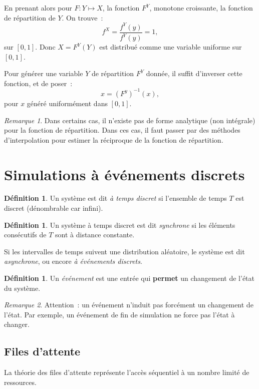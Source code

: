 \documentclass{article}
\theoremstyle{definition}
\newtheorem{déf}[thm]{Définition}
\theoremstyle{remark}
\newtheorem*{rmq}{Remarque}
\begin{document}
	En prenant alors pour $F : Y \mapsto X$, la fonction $F^Y$, monotone croissante, la fonction de répartition de $Y$. On trouve~:
	\[f^X = \frac {f^Y(y)}{f^Y(y)} = 1,\]
	sur $[0, 1]$. Donc $X = F^Y(Y)$ est distribué comme une variable uniforme sur $[0, 1]$.

	Pour générer une variable $Y$ de répartition $F^Y$ donnée, il suffit d'inverser cette fonction, et de poser~:
	\[x = \left(F^{y}\right)^{-1}(x),\]
	pour $x$ généré uniformément dans $[0, 1]$.

	\begin{rmq} Dans certains cas, il n'existe pas de forme analytique (non intégrale) pour la fonction de répartition. Dans ces cas, il faut passer par des
	méthodes d'interpolation pour estimer la réciproque de la fonction de répartition.
	\end{rmq}

\section{Simulations à événements discrets}
	\begin{déf} Un système est dit \textit{à temps discret} si l'ensemble de temps $T$ est discret (dénombrable car infini).
	\end{déf}

	\begin{déf} Un système à temps discret est dit \textit{synchrone} si les éléments consécutifs de $T$ sont à distance constante.

	Si les intervalles de temps suivent une distribution aléatoire, le système est dit \textit{asynchrone}, ou encore \textit{à événements discrets}.
	\end{déf}

	\begin{déf} Un \textit{événement} est une entrée qui \textbf{permet} un changement de l'état du système.
	\end{déf}

	\begin{rmq} Attention~: un événement n'induit pas forcément un changement de l'état. Par exemple, un événement de fin de simulation ne force pas l'état à
	changer.
	\end{rmq}

	\subsection{Files d'attente}

	La théorie des files d'attente représente l'accès séquentiel à un nombre limité de ressources.
\end{document}
